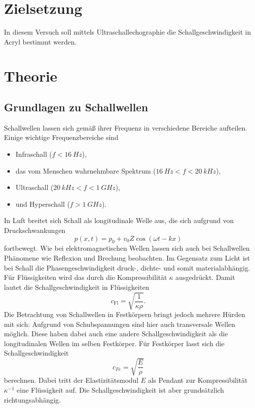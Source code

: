 \section*{Zielsetzung}
\label{sec:Zielsetzung}
In diesem Versuch soll mittels Ultraschallechographie die Schallgeschwindigkeit in Acryl bestimmt werden.

\section{Theorie}
\label{sec:Theorie}

\subsection{Grundlagen zu Schallwellen}
\label{sec:GrundlagenSchallwellen}

Schallwellen lassen sich gemäß ihrer Frequenz in verschiedene Bereiche aufteilen. Einige wichtige 
Frequenzbereiche sind
\begin{itemize}
	\item Infraschall ($f < \SI{16}{Hz}$),
	\item das vom Menschen wahrnehmbare Spektrum ($\SI{16}{Hz} < f < \SI{20}{kHz}$),
	\item Ultraschall ($\SI{20}{kHz} < f < \SI{1}{GHz}$),
	\item und Hyperschall ($f > \SI{1}{GHz}$).
\end{itemize}
In Luft breitet sich Schall als longitudinale Welle aus, die sich aufgrund von Druckschwankungen
\begin{equation}
	p(x,t) = p_0 + v_0 Z \cos(\omega t - kx)
\end{equation}
fortbewegt. 
Wie bei elektromagnetischen Wellen lassen sich auch bei Schallwellen Phänomene wie Reflexion und Brechung
beobachten. Im Gegensatz zum Licht ist bei Schall die Phasengeschwindigkeit druck-, dichte- und somit
materialabhängig. Für Flüssigkeiten wird das durch die Kompressibilität $\kappa$ ausgedrückt.
Damit lautet die Schallgeschwindigkeit in Flüssigkeiten
\begin{equation}
	\label{eqn:c_fl}
	c_\text{Fl} = \sqrt{\frac{1}{\kappa \rho}}.
\end{equation}
Die Betrachtung von Schallwellen in Festkörpern bringt jedoch mehrere Hürden mit sich: Aufgrund von
Schubspannungen sind hier auch transversale Wellen möglich. Diese haben dabei auch eine andere Schallgeschwindigkeit
als die longitudinalen Wellen im selben Festkörper. Für Festkörper lasst sich die Schallgeschwindigkeit
\begin{equation}
	\label{eqn:c_fe}
	c_{Fe} = \sqrt{\frac{E}{\rho}}
\end{equation}
berechnen. Dabei tritt der Elastizitätsmodul $E$ als Pendant zur Kompressibilität $\kappa^{-1}$ eine Flüssigkeit
auf. Die Schallgeschwindigkeit ist aber grundsätzlich richtungsabhängig.


